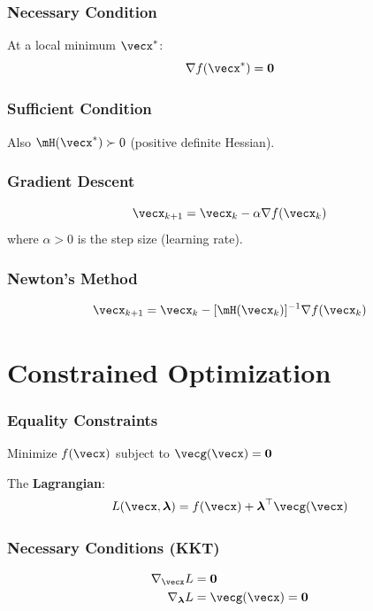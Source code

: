 \subsubsection{Necessary Condition}
At a local minimum $\vecx^*$:
\begin{equation}
\nabla f(\vecx^*) = \mathbf{0}
\end{equation}

\subsubsection{Sufficient Condition}
Also $\mH(\vecx^*) \succ 0$ (positive definite Hessian).

\subsubsection{Gradient Descent}
\begin{equation}
\vecx_{k+1} = \vecx_k - \alpha \nabla f(\vecx_k)
\end{equation}
where $\alpha > 0$ is the step size (learning rate).

\subsubsection{Newton's Method}
\begin{equation}
\vecx_{k+1} = \vecx_k - [\mH(\vecx_k)]^{-1} \nabla f(\vecx_k)
\end{equation}

\section{Constrained Optimization}

\subsubsection{Equality Constraints}
Minimize $f(\vecx)$ subject to $\vecg(\vecx) = \mathbf{0}$

The \textbf{Lagrangian}:
\begin{equation}
L(\vecx, \boldsymbol{\lambda}) = f(\vecx) + \boldsymbol{\lambda}^\top \vecg(\vecx)
\end{equation}

\subsubsection{Necessary Conditions (KKT)}
\begin{align}
\nabla_\vecx L &= \mathbf{0} \\
\nabla_{\boldsymbol{\lambda}} L &= \vecg(\vecx) = \mathbf{0}
\end{align}

